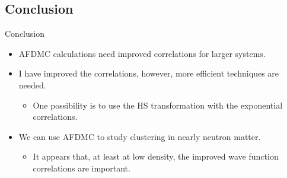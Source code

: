 \documentclass{beamer}
\begin{document}
\subsection{Conclusion}
\begin{frame}{Conclusion}
\begin{itemize}
   \item AFDMC calculations need improved correlations for larger systems.
   \item I have improved the correlations, however, more efficient techniques are needed.
   \begin{itemize}
      \item One possibility is to use the HS transformation with the exponential correlations.
   \end{itemize}
   \item We can use AFDMC to study clustering in nearly neutron matter.
   \begin{itemize}
      \item It appears that, at least at low density, the improved wave function correlations are important.
   \end{itemize}
\end{itemize}
\end{frame}
\end{document}
